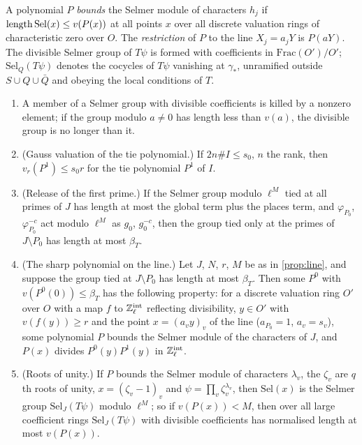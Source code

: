 A polynomial $P$ \emph{bounds} the Selmer module of characters $h_j$ if $\operatorname{length}\mathrm{Sel}(x)\le v(P(x))$ at all points $x$ over all discrete valuation rings of characteristic zero over $O$. The \emph{restriction} of $P$ to the line $X_j=a_jY$ is $P(aY)$. The divisible Selmer group of $T\psi$ is formed with coefficients in $\mathrm{Frac}(O')/O'$; $\mathrm{Sel}_Q(T\psi)$
denotes the cocycles of $T\psi$ vanishing at $\gamma_*$, unramified outside $S\cup Q\cup\bar Q$ and obeying the local conditions of $T$.

\begin{lemma}\label{lem:tied-to-twisted}
\begin{enumerate}[label=\textup{(\alph*)}]
\item A member of a Selmer group with divisible coefficients is killed by a nonzero element; if the group modulo $a\ne0$ has length less than $v(a)$, the divisible group is no longer than it.
\item (Gauss valuation of the tie polynomial.) If $2n\#I\le s_0$, $n$ the rank, then $v_r(P^1)\le s_0r$ for the tie polynomial $P^1$ of $I$.
\item (Release of the first prime.) If the Selmer group modulo $\ell^M$ tied at all primes of $J$ has length at most the global term plus the places term, and $\varphi_{P_0}$, $\varphi_{P_0}^{-c}$ act modulo $\ell^M$ as $g_0$, $g_0^{-c}$, then the group tied only at the primes of $J\setminus P_0$ has length at most $\beta_T$.
\item (The sharp polynomial on the line.) Let $J$, $N$, $r$, $M$ be as in \cref{prop:line}, and suppose the group tied at $J\setminus P_0$ has length at most $\beta_T$. Then some $P^0$ with $v(P^0(0))\le\beta_T$ has the following property: for a discrete valuation ring $O'$ over $O$ with a map $f$ to $\mathbb{Z}_\ell^{\rm int}$ reflecting divisibility, $y\in O'$
with $v(f(y))\ge r$ and the point $x=(a_vy)_v$ of the line ($a_{P_0}=1$, $a_v=s_v$), some polynomial $P$ bounds the Selmer module of the characters of $J$, and $P(x)$ divides $P^0(y)P^1(y)$ in $\mathbb{Z}_\ell^{\rm int}$.
\item (Roots of unity.) If $P$ bounds the Selmer module of characters $\lambda_v$, the $\zeta_v$ are $q$th roots of unity, $x=(\zeta_v-1)_v$ and $\psi=\prod_v\zeta_v^{\lambda_v}$, then $\mathrm{Sel}(x)$ is the Selmer group $\mathrm{Sel}_J(T\psi)$ modulo $\ell^M$; so if $v(P(x))<M$, then over all large coefficient rings $\mathrm{Sel}_J(T\psi)$ with divisible coefficients has
normalised length at most $v(P(x))$.
\end{enumerate}
\end{lemma}


